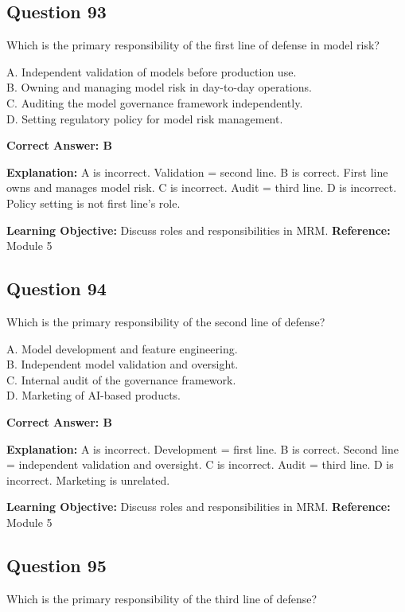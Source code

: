 \documentclass[11pt]{article}
\begin{document}
	\subsection*{Question 93}
	Which is the primary responsibility of the first line of defense in
	model risk?
	
	A. Independent validation of models before production use.\\
	B. Owning and managing model risk in day-to-day operations.\\
	C. Auditing the model governance framework independently.\\
	D. Setting regulatory policy for model risk management.
	
	\vspace{0.4em}
	\textbf{Correct Answer: B}
	
	\textbf{Explanation:}
	A is incorrect. Validation = second line.
	B is correct. First line owns and manages model risk.
	C is incorrect. Audit = third line.
	D is incorrect. Policy setting is not first line's role.
	
	\textbf{Learning Objective:} Discuss roles and responsibilities in MRM.
	\textbf{Reference:} Module 5
	
	\subsection*{Question 94}
	Which is the primary responsibility of the second line of defense?
	
	A. Model development and feature engineering.\\
	B. Independent model validation and oversight.\\
	C. Internal audit of the governance framework.\\
	D. Marketing of AI-based products.
	
	\vspace{0.4em}
	\textbf{Correct Answer: B}
	
	\textbf{Explanation:}
	A is incorrect. Development = first line.
	B is correct. Second line = independent validation and oversight.
	C is incorrect. Audit = third line.
	D is incorrect. Marketing is unrelated.
	
	\textbf{Learning Objective:} Discuss roles and responsibilities in MRM.
	\textbf{Reference:} Module 5
	
	\subsection*{Question 95}
	Which is the primary responsibility of the third line of defense?
	
\end{document}

